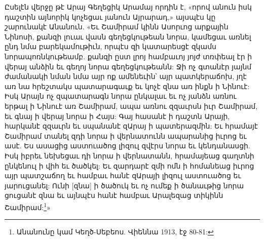 \documentclass{article}
\begin{document}
{Ըսելէն վերջը թէ Արայ Գեղեցիկ Արամայ որդին է, «որով անուն իսկ դաշտին այնորիկ կոչեցաւ յանուն Այրարադ,» այսպէս կը շարունակէ Անանուն. «Եւ Շամիրամ կինն Ասորւոց արքային Նինոսի, քանզի լուաւ վասն գեղեցկութեան նորա, կամեցաւ առնել ընդ նմա բարեկամութիւն, որպէս զի կատարեսցէ զկամս նորապոռնկութեամբ. քանզի ըստ լրոյ համբաւոյ յոյժ տռփեալ էր ի վերայ անձին եւ գեղոյ նորա գեղեցկութեանն: Ջի ոչ գտանէր յայնմ ժամանակի նման նմա այր ոք ամենեւին՝ այր պատկերաճոխ, յղէ առ նա հրեշտակս պատարագաւք եւ կոչէ զնա առ ինքն ի Նինուէ: Իսկ Արայն ոչ զպատարագն նորա ընկալաւ եւ ոչ յանձն առնու երթալ ի Նինուէ առ Շամիրամ, ապա առնու զզաւրսն իւր Շամիրամ, եւ գնայ ի վերայ նորա ի Հայս: Գայ հասանէ ի դաշտն Արայի, հարկանէ զզաւրն եւ սպանանէ զԱրայ ի պատերազմին: Եւ հրամայէ Շամիրամ տանել զդի նորա ի վերնատունն ապարանից իւրոց եւ ասէ. Ես ասացից աստուածոց լիզուլ զվէրս նորա եւ կենդանասցի. Իսկ իբրեւ նեխեցաւ դի նորա ի վերնատանն, հրամայեաց գաղտնի ընկենուլ ի վիհ եւ ծածկել: Եւ զարդարէ զմի ոմն ի հոմանեաց իւրոց այր պատշաճող եւ համբաւ հանէ զԱրայի լիզուլ աստուածոց եւ յարուցանել: Ունի [զնա] ի ծածուկ եւ ոչ ումեք ի ծանաւթից նորա ցուցանէ զնա եւ այնպէս հանէ համբաւ Արալեզաց տիկինն Շամիրամ:\footnote{Անանունը կամ Կեղծ-Սեբեոս. Վիեննա 1913, էջ 80-81:}»

}
\end{document}
